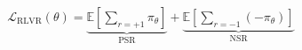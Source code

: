 \documentclass[preview]{standalone}
\begin{document}
\begin{align*}
\mathcal{L}_{\mathrm{RLVR}}(\theta) =
            \underbrace{\mathbb{E}\!\left[\sum_{r=+1}\pi_\theta\right]}_{\text{ PSR }}
            + 
            \underbrace{\mathbb{E}\!\left[\sum_{r=-1}(-\pi_\theta)\right]}_{\text{ NSR }}
\end{align*}
\end{document}
